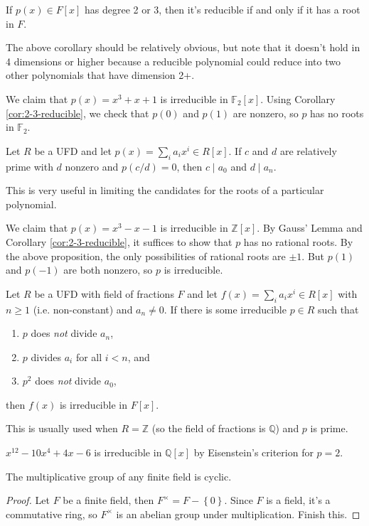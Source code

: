\documentclass[10pt]{report}
\begin{document}
\begin{cor}
	\label{cor:2-3-reducible}
	If $p(x) \in F[x]$ has degree 2 or 3, then it's reducible if and only if it has a root in $F$.
\end{cor}

The above corollary should be relatively obvious, but note that it doesn't hold in 4 dimensions or higher because a reducible polynomial could reduce into two other polynomials that have dimension 2+.

\begin{ex}[]
	We claim that $p(x) = x^3+x+1$ is irreducible in $\mathbb{F}_{2}[x]$. Using Corollary \ref{cor:2-3-reducible}, we check that $p(0)$ and $p(1)$ are nonzero, so $p$ has no roots in $\mathbb{F}_{2}$.
\end{ex}

\begin{prop}
	Let $R$ be a UFD and let $p(x) = \sum_i a_i x^i \in R[x]$. If $c$ and $d$ are relatively prime with $d$ nonzero and $p(c/d) = 0$, then $c \;|\; a_0$ and $d \;|\; a_n$.
\end{prop}

This is very useful in limiting the candidates for the roots of a particular polynomial.

\begin{ex}[]
	We claim that $p(x) = x^3-x-1$ is irreducible in $\mathbb{Z}[x]$. By Gauss' Lemma and Corollary \ref{cor:2-3-reducible}, it suffices to show that $p$ has no rational roots. By the above proposition, the only possibilities of rational roots are $\pm 1$. But $p(1)$ and $p(-1)$ are both nonzero, so $p$ is irreducible.
\end{ex}

\begin{thrm}
	Let $R$ be a UFD with field of fractions $F$ and let $f(x) = \sum_i a_i x^i \in R[x]$ with $n \geq 1$ (i.e. non-constant) and $a_n \neq 0$. If there is some irreducible $p \in R$ such that
	\begin{enumerate}
		\item $p$ does \textit{not} divide $a_n$,
		\item $p$ divides $a_i$ for all $i < n$, and
		\item $p^2$ does \textit{not} divide $a_0$,
	\end{enumerate}
	then $f(x)$ is irreducible in $F[x]$.
\end{thrm}

This is usually used when $R=\mathbb{Z}$ (so the field of fractions is $\mathbb{Q}$) and $p$ is prime.

\begin{ex}[]
	$x^{12}-10x^{4}+4x-6$ is irreducible in $\mathbb{Q}[x]$ by Eisenstein's criterion for $p=2$.
\end{ex}

\begin{thrm}[]
	The multiplicative group of any finite field is cyclic.
\end{thrm}
\begin{proof}
	Let $F$ be a finite field, then $F^\times = F-\left\{ 0 \right\}$. Since $F$ is a field, it's a commutative ring, so $F^\times$ is an abelian group under multiplication. {\color{red}Finish this.}
\end{proof}
\end{document}

